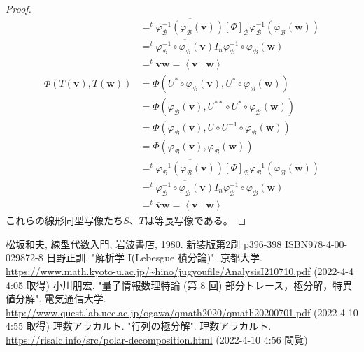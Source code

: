 \documentclass[dvipdfmx]{jsarticle}
\begin{document}
\begin{proof}
\begin{align*}
&=^{t}\overline{\varphi_{\mathcal{B}}^{- 1}\left( \varphi_{\mathcal{B}}\left( \mathbf{v} \right) \right)}[\varPhi]_{\mathcal{B}}\varphi_{\mathcal{B}}^{- 1}\left( \varphi_{\mathcal{B}}\left( \mathbf{w} \right) \right)\\
&=^{t}\overline{\varphi_{\mathcal{B}}^{- 1} \circ \varphi_{\mathcal{B}}\left( \mathbf{v} \right)}I_{n}\varphi_{\mathcal{B}}^{- 1} \circ \varphi_{\mathcal{B}}\left( \mathbf{w} \right)\\
&=^{t}\overline{\mathbf{v}}\mathbf{w}=\left\langle \mathbf{v} \middle| \mathbf{w} \right\rangle\\
\varPhi\left( T\left( \mathbf{v} \right),T\left( \mathbf{w} \right) \right) &= \varPhi\left( U^{*} \circ \varphi_{\mathcal{B}}\left( \mathbf{v} \right),U^{*} \circ \varphi_{\mathcal{B}}\left( \mathbf{w} \right) \right)\\
&= \varPhi\left( \varphi_{\mathcal{B}}\left( \mathbf{v} \right),U^{**} \circ U^{*} \circ \varphi_{\mathcal{B}}\left( \mathbf{w} \right) \right)\\
&= \varPhi\left( \varphi_{\mathcal{B}}\left( \mathbf{v} \right),U \circ U^{- 1} \circ \varphi_{\mathcal{B}}\left( \mathbf{w} \right) \right)\\
&= \varPhi\left( \varphi_{\mathcal{B}}\left( \mathbf{v} \right),\varphi_{\mathcal{B}}\left( \mathbf{w} \right) \right)\\
&=^{t}\overline{\varphi_{\mathcal{B}}^{- 1}\left( \varphi_{\mathcal{B}}\left( \mathbf{v} \right) \right)}[\varPhi]_{\mathcal{B}}\varphi_{\mathcal{B}}^{- 1}\left( \varphi_{\mathcal{B}}\left( \mathbf{w} \right) \right)\\
&=^{t}\overline{\varphi_{\mathcal{B}}^{- 1} \circ \varphi_{\mathcal{B}}\left( \mathbf{v} \right)}I_{n}\varphi_{\mathcal{B}}^{- 1} \circ \varphi_{\mathcal{B}}\left( \mathbf{w} \right)\\
&=^{t}\overline{\mathbf{v}}\mathbf{w}=\left\langle \mathbf{v} \middle| \mathbf{w} \right\rangle
\end{align*}
これらの線形同型写像たち$S$、$T$は等長写像である。
\end{proof}
\begin{thebibliography}{50}
    松坂和夫, 線型代数入門, 岩波書店, 1980. 新装版第2刷 p396-398 ISBN978-4-00-029872-8
    日野正訓. "解析学 I(Lebesgue 積分論)". 京都大学. \url{https://www.math.kyoto-u.ac.jp/~hino/jugyoufile/AnalysisI210710.pdf} (2022-4-4 4:05 取得)
    小川朋宏. "量子情報数理特論 (第 8 回) 部分トレース，極分解，特異値分解". 電気通信大学. \url{http://www.quest.lab.uec.ac.jp/ogawa/qmath2020/qmath20200701.pdf} (2022-4-10 4:55 取得)
    理数アラカルト. "行列の極分解". 理数アラカルト. \url{https://risalc.info/src/polar-decomposition.html}
    (2022-4-10 4:56 閲覧)
\end{thebibliography}
\end{document}
